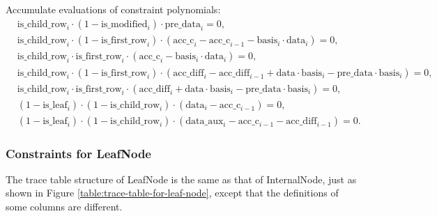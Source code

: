 Accumulate evaluations of constraint polynomials:
\begin{align*}
    & \mathrm{is\_child\_row}_i \cdot (1-\mathrm{is\_modified}_i) \cdot \mathrm{pre\_data}_i=0, \\
    & \mathrm{is\_child\_row}_i \cdot (1-\mathrm{is\_first\_row}_i) \cdot (\mathrm{acc\_c}_i-\mathrm{acc\_c}_{i-1}-\mathrm{basis}_i \cdot \mathrm{data}_i)=0, \\
    & \mathrm{is\_child\_row}_i \cdot \mathrm{is\_first\_row}_i \cdot (\mathrm{acc\_c}_i-\mathrm{basis}_i \cdot \mathrm{data}_i)=0, \\
    & \mathrm{is\_child\_row}_i \cdot (1-\mathrm{is\_first\_row}_i) \cdot (\mathrm{acc\_diff}_i-\mathrm{acc\_diff}_{i-1}+\mathrm{data} \cdot \mathrm{basis}_i-\mathrm{pre\_data} \cdot \mathrm{basis}_i)=0, \\
    & \mathrm{is\_child\_row}_i \cdot \mathrm{is\_first\_row}_i \cdot (\mathrm{acc\_diff}_i+\mathrm{data} \cdot \mathrm{basis}_i-\mathrm{pre\_data} \cdot \mathrm{basis}_i)=0, \\
    & (1-\mathrm{is\_leaf}_i) \cdot (1-\mathrm{is\_child\_row}_i) \cdot (\mathrm{data}_i-\mathrm{acc\_c}_{i-1})=0, \\
    & (1-\mathrm{is\_leaf}_i) \cdot (1-\mathrm{is\_child\_row}_i) \cdot (\mathrm{data\_aux}_i-\mathrm{acc\_c}_{i-1}-\mathrm{acc\_diff}_{i-1})=0.
\end{align*}

\subsubsection{Constraints for LeafNode}

The trace table structure of LeafNode is the same as that of InternalNode, just as shown in Figure \ref{table:trace-table-for-leaf-node}, except that the definitions of some columns are different.


